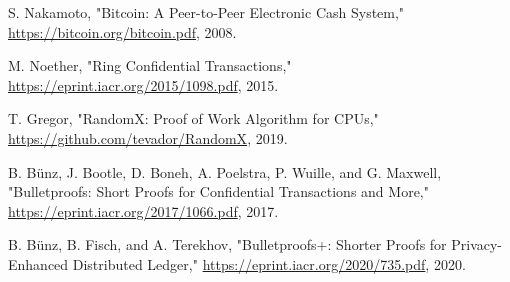 \documentclass[11pt]{article}
\begin{document}
\begin{thebibliography}{9}
S. Nakamoto, "Bitcoin: A Peer-to-Peer Electronic Cash System," \url{https://bitcoin.org/bitcoin.pdf}, 2008.

M. Noether, "Ring Confidential Transactions," \url{https://eprint.iacr.org/2015/1098.pdf}, 2015.

T. Gregor, "RandomX: Proof of Work Algorithm for CPUs," \url{https://github.com/tevador/RandomX}, 2019.

B. Bünz, J. Bootle, D. Boneh, A. Poelstra, P. Wuille, and G. Maxwell, "Bulletproofs: Short Proofs for Confidential Transactions and More," \url{https://eprint.iacr.org/2017/1066.pdf}, 2017.

B. Bünz, B. Fisch, and A. Terekhov, "Bulletproofs+: Shorter Proofs for Privacy-Enhanced Distributed Ledger," \url{https://eprint.iacr.org/2020/735.pdf}, 2020.
\end{thebibliography}
\end{document}
